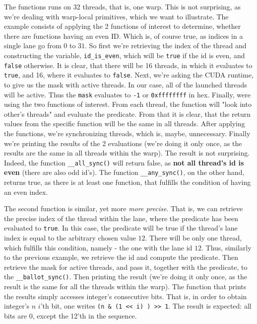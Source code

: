 The functions runs on 32 threads, that is, one warp. This is not surprising, as we're dealing with 
warp-local primitives, which we want to illustrate. The example consists of applying the 2 functions of 
interest to determine, whether there are functions having an even ID. Which is, of course true, as indices in 
a single lane go from $0$ to $31$. So first we're retrieving the index of the thread and constructing the variable, 
\verb|id_is_even|, which will be \verb|true| if the id is even, and \verb|false| otherwise. It is clear, that there will be 16
threads, in which it evaluates to \verb|true|, and 16, where it evaluates to \verb|false|. Next, we're asking the CUDA 
runtime, to give us the mask with active threads. In our case, all of the launched threads will be active. Thus the \verb|mask| 
evaluates to \verb|-1| or \verb|0xffffffff| in hex. Finally, were using the two functions of interest. From each thread, 
the function will "look into other's threads" and evaluate the predicate. From that it is clear, that the return values from 
the specific function will be the same in all threads. After applying the functions, we're synchronizing threads, which is, maybe, 
unnecessary. Finally we're printing the results of the 2 evaluations (we're doing it only once, as the results are the same in all threads within the warp). The result is not surprising. Indeed, the function \verb|__all_sync()| will return false, as \textbf{not all thread's 
id is even} (there are also odd id's). The function \verb|__any_sync()|, on the other hand, returns true, as there is at least one 
function, that fulfills the condition of having an even index.


The second function is similar, yet more \textit{more precise}. That is, we can retrieve the precise index of the thread within the lane, 
where the predicate has been evaluated to \verb|true|. In this case, the predicate will be true if the thread's lane index is equal to the 
arbitrary chosen value $12$. There will be only one thread, which fulfills this condition, namely - the one with the lane id $12$. Thus, 
similarly to the previous example, we retrieve the id and compute the predicate. Then retrieve the mask for active threads, and 
pass it, together with the predicate, to the \verb|__ballot_sync()|. Then printing the result (we're doing it only once, as the 
result is the same for all the threads within the warp). The function that prints the results simply accesses integer's 
consecutive bits. That is, in order to obtain integer's $n$ $i$'th bit, one writes \verb|(n & (1 << i) ) >> 1|. The result is expected: 
all bits are $0$, except the 12'th in the sequence.












